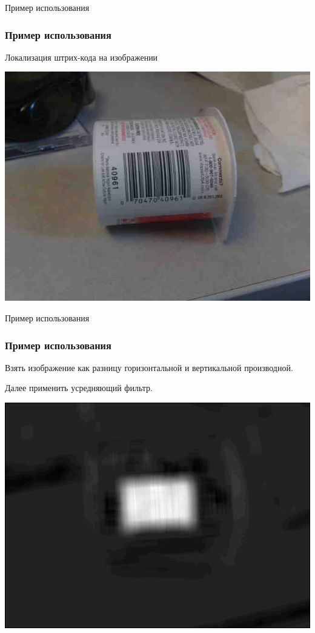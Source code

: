 \documentclass{beamer}
\begin{document}
\begin{frame}{Пример использования}
\frametitle{Пример использования}
	Локализация штрих-кода на изображении
 \begin{center}
  \includegraphics[width= 0.8\linewidth]{images/11.jpg}  
 \end{center}
\end{frame}

\begin{frame}{Пример использования}
\frametitle{Пример использования}
Взять изображение как разницу горизонтальной и вертикальной производной.

Далее применить усредняющий фильтр.
 \begin{center}
  \includegraphics[width= 0.8\linewidth]{images/22.jpg}  
 \end{center}
\end{frame}
\end{document}
